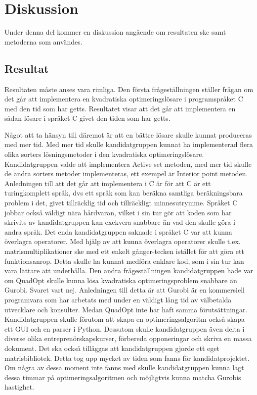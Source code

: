 \section{Diskussion}
Under denna del kommer en diskussion angående om resultaten ske samt metoderna som användes.

\subsection{Resultat}
Resultaten måste anses vara rimliga. Den första frågeställningen ställer frågan om det går att implementera en kvadratiska optimeringslösare i programspråket C med den tid som har getts. Resultatet visar att det går att implementera en sådan lösare i språket C givet den tiden som har getts.

Något att ta hänsyn till däremot är att en bättre lösare skulle kunnat produceras med mer tid. Med mer tid skulle kandidatgruppen kunnat ha implementerad flera olika sorters lösningsmetoder i den kvadratiska optimeringslösare. Kandidatgruppen valde att implementera Active set metoden, med mer tid skulle de andra sorters metoder implementeras, ett exempel är Interior point metoden. Anledningen till att det går att implementera i C är för att C är ett turingkomplett språk, dvs ett språk som kan beräkna samtliga beräkningsbara problem i det, givet tillräcklig tid och tillräckligt minnesutrymme. Språket C jobbar också väldigt nära hårdvaran, vilket i sin tur gör att koden som har skrivits av kandidatgruppen kan exekvera snabbare än vad den skulle göra i andra språk. Det enda kandidatgruppen saknade i språket C var att kunna överlagra operatorer. Med hjälp av att kunna överlagra operatorer skulle t.ex. matrismultiplikationer ske med ett enkelt gånger-tecken istället för att göra ett funktionsanrop. Detta skulle ha kunnat medföra enklare kod, som i sin tur kan vara lättare att underhålla. 
\newline
\newline
Den andra frågeställningen kandidatgruppen hade var om QuadOpt skulle kunna lösa kvadratiska optimeringsproblem snabbare än Gurobi. Svaret vart nej. Anledningen till detta är att Gurobi är en kommersiell programvara som har arbetats med under en väldigt lång tid av välbetalda utvecklare och konsulter. Medan QuadOpt inte har haft samma förutsättningar. Kandidatgruppen skulle förutom att skapa en optimeringsalgoritm också skapa ett GUI och en parser i Python. Dessutom skulle kandidatgruppen även delta i diverse olika entreprenörskapskurser, förbereda opponeringar och skriva en massa dokument. Det ska också tilläggas att kandidatgruppen gjorde ett eget matrisbibliotek. Detta tog upp mycket av tiden som fanns för kandidatprojektet. Om några av dessa moment inte fanns med skulle kandidatgruppen kunna lagt dessa timmar på optimeringsalgoritmen och möjligtvis kunna matcha Gurobis hastighet.
